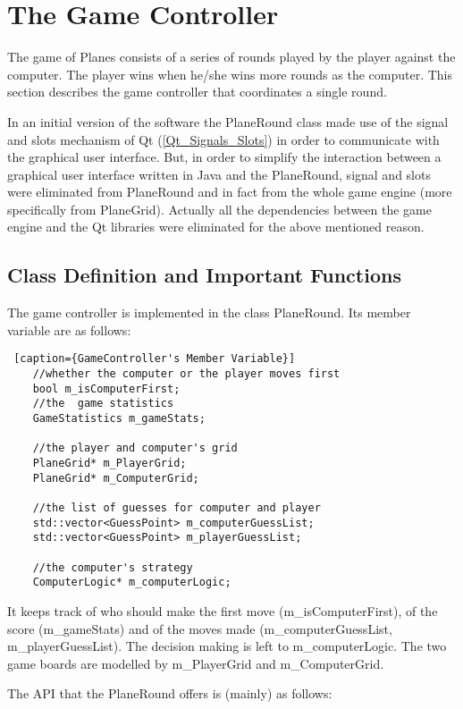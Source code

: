 \section{The Game Controller}  \label {Game_Controller}

The game of Planes consists of a series of rounds played by the player against the computer. The player wins when he/she wins more rounds as the computer. This section describes the game controller that coordinates a single round. 

In an initial version of the software the PlaneRound class made use of the signal and slots mechanism of Qt (\ref{Qt_Signals_Slots}) in order to communicate with the graphical user interface. But, in order to simplify the interaction between a graphical user interface written in Java and the PlaneRound, signal and slots were eliminated from PlaneRound and in fact from the whole game engine (more specifically from PlaneGrid). Actually all the dependencies between the game engine and the Qt libraries were eliminated for the above mentioned reason.

\subsection {Class Definition and Important Functions}

The game controller is implemented in the class PlaneRound. Its member variable are as follows:

\begin{lstlisting} [caption={GameController's Member Variable}]
	//whether the computer or the player moves first
	bool m_isComputerFirst;
	//the  game statistics
	GameStatistics m_gameStats;
	
	//the player and computer's grid
	PlaneGrid* m_PlayerGrid;
	PlaneGrid* m_ComputerGrid;
	
	//the list of guesses for computer and player
	std::vector<GuessPoint> m_computerGuessList;
	std::vector<GuessPoint> m_playerGuessList;
	
	//the computer's strategy
	ComputerLogic* m_computerLogic;
\end{lstlisting}

It keeps track of who should make the first move (m\_isComputerFirst), of the score (m\_gameStats) and of the moves made (m\_computerGuessList, m\_playerGuessList). The decision making is left to m\_computerLogic. The two game boards are modelled by m\_PlayerGrid and m\_ComputerGrid.

The API that the PlaneRound offers is (mainly) as follows:


